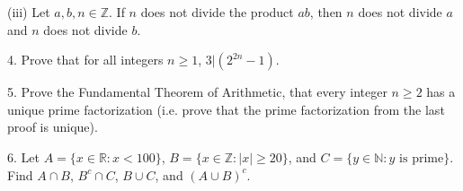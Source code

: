 \documentclass{article}
\theoremstyle{remark} %
\newcommand{\R}{{\mathbb{R}}}
\newcommand{\Z}{{\mathbb{Z}}}
\newcommand{\N}{{\mathbb{N}}}
\begin{document}
\vspace{12cm} %




(iii) Let $a,b,n \in \Z$. If $n$ does not divide the product $ab$, then $n$ does not divide $a$ and $n$ does not divide $b$.

\vspace{11cm} %




4. Prove that for all integers $n \geq 1$, $3|(2^{2n}-1)$.

\vspace{12cm} %




5. Prove the Fundamental Theorem of Arithmetic, that every integer $n \geq 2$ has a unique prime factorization (i.e. prove that the prime factorization from the last proof is unique).

\vspace{11cm} %




6. Let $A = \{x\in \R : x <100\}$, $B = \{x\in \Z : |x| \geq 20\}$, and $C = \{y \in \N : y \text{ is prime}\}$. Find $A \cap B$, $B^c \cap C$, $B \cup C$, and $(A \cup B )^c$.


\vspace{11cm} %

\end{document}
